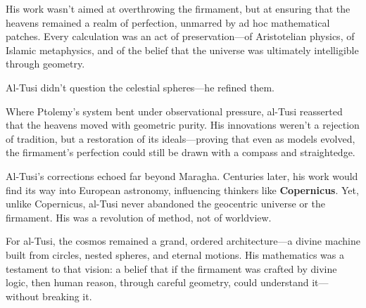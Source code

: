 His work wasn’t aimed at overthrowing the firmament, but at ensuring that the heavens remained a realm of perfection, unmarred by ad hoc mathematical patches. Every calculation was an act of preservation—of Aristotelian physics, of Islamic metaphysics, and of the belief that the universe was ultimately intelligible through geometry.

\begin{tcolorbox}[colback=blue!5!white, colframe=blue!50!black, title={Mathematics in Service of the Firmament}]
Al-Tusi didn’t question the celestial spheres—he refined them.

Where Ptolemy’s system bent under observational pressure, al-Tusi reasserted that the heavens moved with geometric purity. His innovations weren’t a rejection of tradition, but a restoration of its ideals—proving that even as models evolved, the firmament’s perfection could still be drawn with a compass and straightedge.
\end{tcolorbox}

Al-Tusi’s corrections echoed far beyond Maragha. Centuries later, his work would find its way into European astronomy, influencing thinkers like \textbf{Copernicus}. Yet, unlike Copernicus, al-Tusi never abandoned the geocentric universe or the firmament. His was a revolution of method, not of worldview.

For al-Tusi, the cosmos remained a grand, ordered architecture—a divine machine built from circles, nested spheres, and eternal motions. His mathematics was a testament to that vision: a belief that if the firmament was crafted by divine logic, then human reason, through careful geometry, could understand it—without breaking it.

